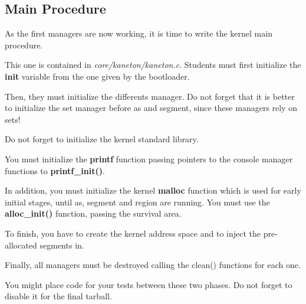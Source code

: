 \subsection{Main Procedure}

As the first managers are now working, it is time to write the kernel
main procedure.

This  one is  contained in \textit{core/kaneton/kaneton.c}. Students
must first initialize the \textbf{init} variable from the one given by
the bootloader.

Then, they  must initialize the differents manager. Do not forget that
it is better to initialize the set manager before as and segment,
since these managers rely on sets!

Do not forget to initialize the kernel standard library.

You must initialize the \textbf{printf} function passing pointers to the
console manager functions to \textbf{printf\_init()}.

In addition, you must initialize the kernel \textbf{malloc} function which
is used for early initial stages, until as, segment and region are running.
You must use the \textbf{alloc\_init()} function, passing the survival area.

To finish, you  have to create the kernel address space and to inject
the pre-allocated segments in.

Finally, all managers must be destroyed calling the clean() functions for
each one.

You might place code for your tests between these two phases. Do not
forget to disable it for the final tarball.
